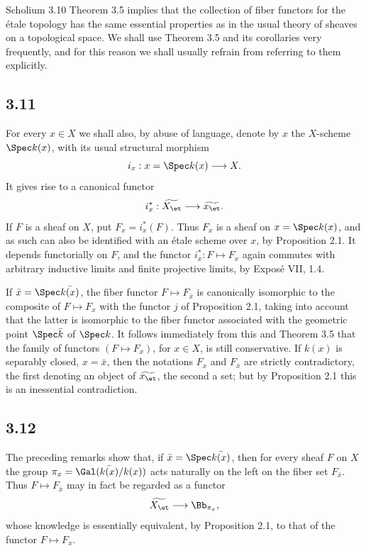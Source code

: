 \begin{remarktext}{Scholium 3.10}
Theorem 3.5 implies that the collection of fiber functors for the \'etale topology has the same essential properties as in the usual theory of sheaves on a topological space. We shall use Theorem 3.5 and its corollaries very frequently, and for this reason we shall usually refrain from referring to them explicitly.
\end{remarktext}

\subsection*{3.11}
For every \(x\in X\) we shall also, by abuse of language, denote by \(x\) the \(X\)-scheme \(\Spec k(x)\), with its usual structural morphism
\[
i_x:x=\Spec k(x)\longrightarrow X.
\]
It gives rise to a canonical functor
\[
i_x^*:\widetilde{X_{\et}}\longrightarrow \widetilde{x_{\et}}.
\]
If \(F\) is a sheaf on \(X\), put \(F_x=i_x^*(F)\). Thus \(F_x\) is a sheaf on \(x=\Spec k(x)\), and as such can also be identified with an \'etale scheme over \(x\), by Proposition 2.1. It depends functorially on \(F\), and the functor \(i_x^*:F\mapsto F_x\) again commutes with arbitrary inductive limits and finite projective limits, by Expos\'e VII, 1.4.

If \(\bar x=\Spec\bar{k(x)}\), the fiber functor \(F\mapsto F_{\bar x}\) is canonically isomorphic to the composite of \(F\mapsto F_x\) with the functor \(j\) of Proposition 2.1, taking into account that the latter is isomorphic to the fiber functor associated with the geometric point \(\Spec\bar k\) of \(\Spec k\). It follows immediately from this and Theorem 3.5 that the family of functors \((F\mapsto F_x)\), for \(x\in X\), is still conservative. If \(k(x)\) is separably closed, \ie \(x=\bar x\), then the notations \(F_x\) and \(F_{\bar x}\) are strictly contradictory, the first denoting an object of \(\widetilde{x_{\et}}\), the second a set; but by Proposition 2.1 this is an inessential contradiction.

\subsection*{3.12}
The preceding remarks show that, if \(\bar x=\Spec\bar{k(x)}\), then for every sheaf \(F\) on \(X\) the group \(\pi_x=\Gal(\bar{k(x)}/k(x))\) acts naturally on the left on the fiber set \(F_{\bar x}\). Thus \(F\mapsto F_{\bar x}\) may in fact be regarded as a functor
\[
\widetilde{X_{\et}}\longrightarrow \Bb_{\pi_x},
\]
whose knowledge is essentially equivalent, by Proposition 2.1, to that of the functor \(F\mapsto F_x\).

